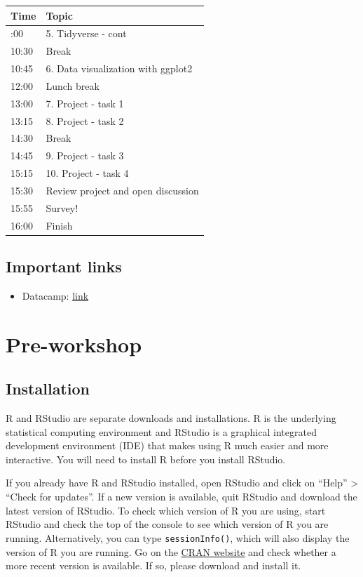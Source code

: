 \documentclass[
]{book}
\providecommand{\tightlist}{%
  \setlength{\itemsep}{0pt}\setlength{\parskip}{0pt}}
\begin{document}
\begin{longtable}[]{@{}ll@{}}
\toprule\noalign{}
Time & Topic \\
\midrule\noalign{}
\endhead
\bottomrule\noalign{}
\endlastfoot
09:00 & 5. Tidyverse - cont \\
10:30 & Break \\
10:45 & 6. Data visualization with ggplot2 \\
12:00 & Lunch break \\
13:00 & 7. Project - task 1 \\
13:15 & 8. Project - task 2 \\
14:30 & Break \\
14:45 & 9. Project - task 3 \\
15:15 & 10. Project - task 4 \\
15:30 & Review project and open discussion \\
15:55 & Survey! \\
16:00 & Finish \\
\end{longtable}

\section{Important links}\label{important-links}

\begin{itemize}
\tightlist
\item
  Datacamp: \href{https://www.datacamp.com/home}{link}
\end{itemize}

\chapter{Pre-workshop}\label{pre-workshop}

\section{Installation}\label{installation}

R and RStudio are separate downloads and installations. R is the underlying statistical computing environment and RStudio is a graphical integrated development environment (IDE) that makes using R much easier and more interactive. You will need to install R before you install RStudio.

If you already have R and RStudio installed, open RStudio and click on ``Help'' \textgreater{} ``Check for updates''. If a new version is available, quit RStudio and download the latest version of RStudio. To check which version of R you are using, start RStudio and check the top of the console to see which version of R you are running. Alternatively, you can type \texttt{sessionInfo()}, which will also display the version of R you are running. Go on the \href{https://cran.r-project.org/bin/windows/base/}{CRAN website} and check whether a more recent version is available. If so, please download and install it.
\end{document}
